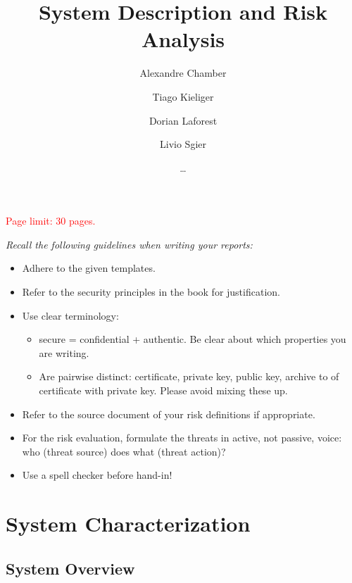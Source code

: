 \documentclass[english]{article}
\title{\huge\sffamily\bfseries System Description and Risk Analysis}
\author{Alexandre Chamber \and Tiago Kieliger \and Dorian Laforest \and Livio Sgier}
\date{\dots}
\begin{document}
\maketitle

\begin{center}
{\large\textcolor{red}{Page limit: 30 pages.}}
\end{center}

\tableofcontents
\pagebreak

\begin{framed}
\noindent
{\it
Recall the following guidelines when writing your reports:
\begin{itemize}
\item Adhere to the given templates.

\item Refer to the security principles in the book for justification.

\item Use clear terminology: 
\begin{itemize}
\item secure = confidential + authentic. Be clear about
which properties you are writing.
\item Are pairwise distinct: certificate, private key, public key, archive to of certificate with private key. Please avoid mixing these up.
\end{itemize}

\item Refer to the source document of your risk definitions if appropriate.

\item For the risk evaluation, formulate the threats in active, not passive, 
voice: who (threat source) does what (threat action)? 

\item Use a spell checker before hand-in!

\end{itemize}
}
\end{framed}


\section{System Characterization}

\subsection{System Overview}
\end{document}
